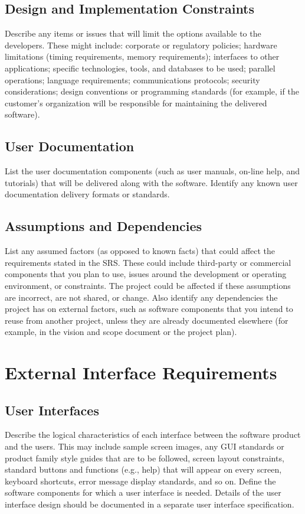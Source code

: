 \documentclass[a4paper,10pt]{article}
\begin{document}
\subsection{Design and Implementation Constraints}
Describe any items or issues that will limit the options available to the developers. These might include: corporate or regulatory policies; hardware limitations (timing requirements, memory requirements); interfaces to other applications; specific technologies, tools, and databases to be used; parallel operations; language requirements; communications protocols; security considerations; design conventions or programming standards (for example, if the customer’s organization will be responsible for maintaining the delivered software).
\subsection{User Documentation}
List the user documentation components (such as user manuals, on-line help, and tutorials) that will be delivered along with the software. Identify any known user documentation delivery formats or standards.
\subsection{Assumptions and Dependencies}
List any assumed factors (as opposed to known facts) that could affect the requirements stated in the SRS. These could include third-party or commercial components that you plan to use, issues around the development or operating environment, or constraints. The project could be affected if these assumptions are incorrect, are not shared, or change. Also identify any dependencies the project has on external factors, such as software components that you intend to reuse from another project, unless they are already documented elsewhere (for example, in the vision and scope document or the project plan).


\section{External Interface Requirements}
\subsection{User Interfaces}
Describe the logical characteristics of each interface between the software product and the users. This may include sample screen images, any GUI standards or product family style guides that are to be followed, screen layout constraints, standard buttons and functions (e.g., help) that will appear on every screen, keyboard shortcuts, error message display standards, and so on. Define the software components for which a user interface is needed. Details of the user interface design should be documented in a separate user interface specification.
\end{document}
